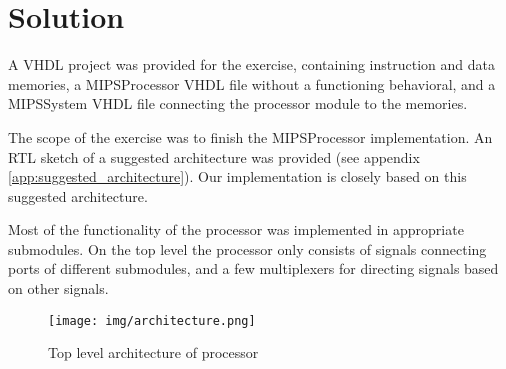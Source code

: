 \chapter{Solution}
A VHDL project was provided for the exercise,
containing instruction and data memories,
a MIPSProcessor VHDL file without a functioning behavioral,
and a MIPSSystem VHDL file connecting the processor module to the memories.

The scope of the exercise was to finish the MIPSProcessor implementation.
An RTL sketch of a suggested architecture was provided (see appendix \ref{app:suggested_architecture}).
Our implementation is closely based on this suggested architecture.

Most of the functionality of the processor was implemented in appropriate submodules.
On the top level the processor only consists of signals connecting ports of different submodules,
and a few multiplexers for directing signals based on other signals.

\begin{figure}[h]
    \centering
    \texttt{[image: img/architecture.png]}
    \caption{Top level architecture of processor}
    \label{fig:architecture}
\end{figure}







